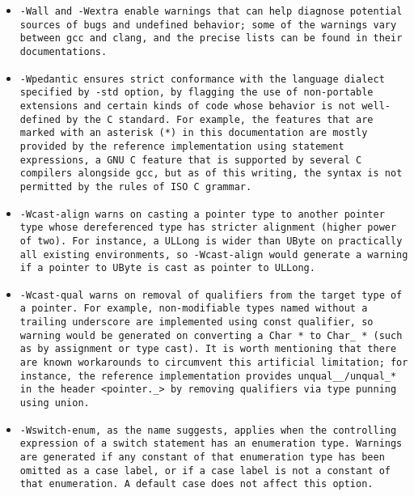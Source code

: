 \begin{itemize}
\item \tt{-Wall} and \tt{-Wextra} enable warnings that can help
diagnose potential sources of bugs and undefined behavior;
some of the warnings vary between \tt{gcc} and \tt{clang},
and the precise lists can be found in their documentations.

\item \tt{-Wpedantic} ensures strict conformance with the language dialect
specified by \tt{-std} option, by flagging the use of non-portable extensions
and certain kinds of code whose behavior is not well-defined by the C standard.
For example, the features that are marked with an asterisk (*) in this
documentation are mostly provided by the reference implementation
using statement expressions, a GNU C feature that is supported by
several C compilers alongside \tt{gcc}, but as of this writing,
the syntax is not permitted by the rules of ISO C grammar.

\item \tt{-Wcast-align} warns on casting a pointer type to another pointer
type whose dereferenced type has stricter alignment (higher power of two).
For instance, a \tt{ULLong} is wider than \tt{UByte} on practically
all existing environments, so \tt{-Wcast-align} would generate a
warning if a pointer to \tt{UByte} is cast as pointer to \tt{ULLong}.

\item \tt{-Wcast-qual} warns on removal of
qualifiers from the target type of a pointer.
For example, non-modifiable types named without a trailing underscore are
implemented using \tt{const} qualifier, so warning would be generated on
converting a \tt{Char *} to \tt{Char_ *} (such as by assignment or type cast).
It is worth mentioning that there are known workarounds to circumvent
this artificial limitation; for instance, the reference implementation
provides \tt{unqual__}/\tt{unqual_}* in the header \tt{<pointer._>}
by removing qualifiers via type punning using \tt{union}.

\item \tt{-Wswitch-enum}, as the name suggests, applies when the
controlling expression of a \tt{switch} statement has an enumeration type.
Warnings are generated if any constant of that enumeration type has been omitted
as a case label, or if a case label is not a constant of that enumeration.
A \tt{default} case does not affect this option.


\end{itemize}
